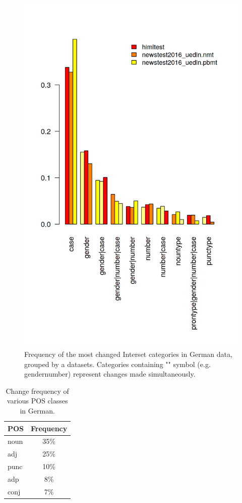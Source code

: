 \begin{figure}
\centering
  \includegraphics[scale=0.7]{iset_de}
  \caption[Change frequency of German morphological categories]{
    Frequency of the most changed Interset categories in German data, grouped by a datasets. Categories containing
    "\textbar" symbol (e.g. gender\textbar{}number) represent changes made simultaneously.
}
  \label{iset_de-barplot}
\end{figure}

\begin{table}[t]
\centering
\small

\begin{tabular}{lc}
POS  &  Frequency  \\
\hline
noun    &   35\%  \\
adj     &   25\%  \\
punc	&	10\%  \\
adp     &   8\%  \\
conj    &   7\%  \\
\end{tabular}
\caption{
	Change frequency of various POS classes in German.
}
\label{changes_de-pos}
\end{table}


